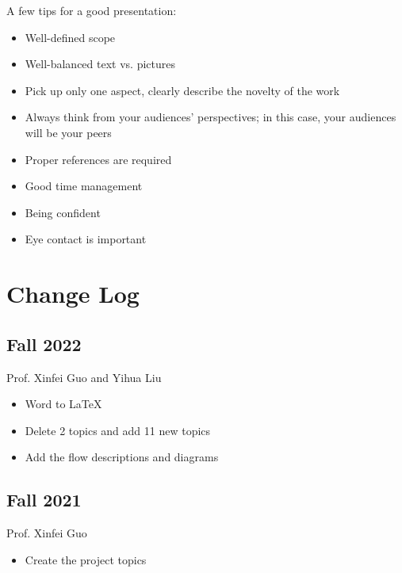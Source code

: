 \documentclass[a4paper,12pt,twoside]{article}
\begin{document}
 A few tips for a good presentation:
\begin{itemize}
    \item Well-defined scope
    \item Well-balanced text vs. pictures
    \item Pick up only one aspect, clearly describe the novelty of the work
    \item Always think from your audiences’ perspectives; in this case, your audiences will be your peers
    \item Proper references are required
    \item Good time management
    \item Being confident
    \item Eye contact is important
\end{itemize}

\section{Change Log}
\subsection{Fall 2022}
Prof. Xinfei Guo and Yihua Liu
\begin{itemize}
    \item Word to LaTeX
    \item Delete 2 topics and add 11 new topics
    \item Add the flow descriptions and diagrams
\end{itemize}
\subsection{Fall 2021}
Prof. Xinfei Guo
\begin{itemize}
    \item Create the project topics
\end{itemize}

\printbibliography
\end{document}
